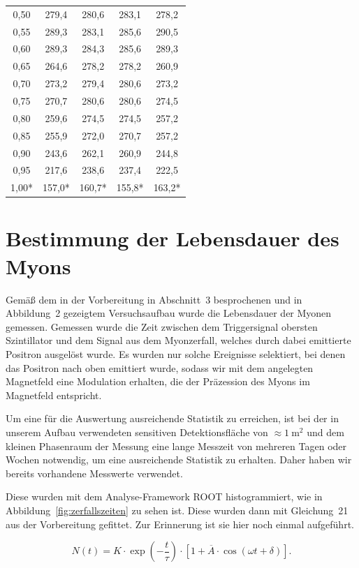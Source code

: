 \documentclass[a4paper,ngerman]{scrartcl}
\begin{document}
\begin{table}[tb!]
\begin{tabular}{ccccc}
0,50 & 279,4 & 280,6 & 283,1 & 278,2 \\
0,55 & 289,3 & 283,1 & 285,6 & 290,5 \\
0,60 & 289,3 & 284,3 & 285,6 & 289,3 \\
0,65 & 264,6 & 278,2 & 278,2 & 260,9 \\
0,70 & 273,2 & 279,4 & 280,6 & 273,2 \\
0,75 & 270,7 & 280,6 & 280,6 & 274,5 \\
0,80 & 259,6 & 274,5 & 274,5 & 257,2 \\
0,85 & 255,9 & 272,0 & 270,7 & 257,2 \\
0,90 & 243,6 & 262,1 & 260,9 & 244,8 \\
0,95 & 217,6 & 238,6 & 237,4 & 222,5 \\
1,00* & 157,0* & 160,7* & 155,8* & 163,2* \\
\bottomrule
\end{tabular}
\label{tab:fieldinhomogenities}
\end{table}


\clearpage
\section{Bestimmung der Lebensdauer des Myons}

Gemäß dem in der Vorbereitung in Abschnitt~3 besprochenen und in
Abbildung~2 gezeigtem Versuchsaufbau wurde die Lebensdauer der Myonen
gemessen. Gemessen wurde die Zeit zwischen dem Triggersignal obersten
Szintillator und dem Signal aus dem Myonzerfall, welches durch dabei
emittierte Positron ausgelöst wurde. Es wurden nur solche Ereignisse
selektiert, bei denen das Positron nach oben emittiert wurde, sodass
wir mit dem angelegten Magnetfeld eine Modulation erhalten, die der
Präzession des Myons im Magnetfeld entspricht.

Um eine für die Auswertung ausreichende Statistik zu erreichen, ist
bei der in unserem Aufbau verwendeten sensitiven Detektionsfläche von
$\approx \SI{1}{\square\meter}$ und dem kleinen Phasenraum der Messung eine
lange Messzeit von mehreren Tagen oder Wochen notwendig, um eine
ausreichende Statistik zu erhalten. Daher haben wir bereits vorhandene
Messwerte verwendet.

Diese wurden mit dem Analyse-Framework ROOT histogrammiert, wie in
Abbildung~\ref{fig:zerfallszeiten} zu sehen ist. Diese wurden dann mit
Gleichung~21 aus der Vorbereitung gefittet. Zur Erinnerung ist sie
hier noch einmal aufgeführt.

\begin{equation}
\label{eq:fitfkt}
N(t) = K \cdot \exp(- \frac{t}{\tau}) \cdot \left[ 1 + \overline{A} \cdot \cos(\omega t + \delta) \right] .
\end{equation}
\end{document}
